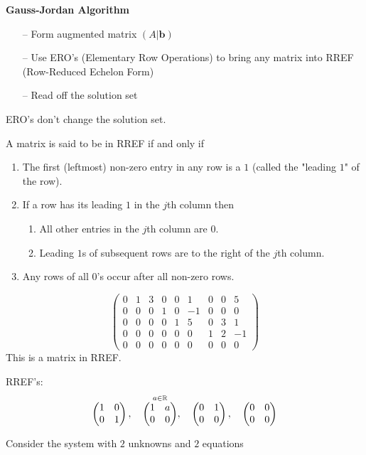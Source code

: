 \documentclass[10pt, a4paper]{article}
\newcommand{\mbf}[1]{\mathbf{#1}}
\begin{document}
\textbf{Gauss-Jordan Algorithm}
\begin{itemize}
    \item[--] Form augmented matrix $(A|\mbf{b})$
    \item[--] Use ERO's (Elementary Row Operations) to bring any matrix into RREF (Row-Reduced Echelon Form)
    \item[--] Read off the solution set
\end{itemize}

ERO's don't change the solution set.

\begin{definition}
    A matrix is said to be in RREF if and only if
    \begin{enumerate}[label = (\roman*)]
        \item The first (leftmost) non-zero entry in any row is a $1$ (called the "leading $1$" of the row).
        \item If a row has its leading $1$ in the $j$th column then
        \begin{enumerate}[label = (\alph*)]
            \item All other entries in the $j$th column are $0$.
            \item Leading $1$s of subsequent rows are to the right of the $j$th column.
        \end{enumerate}
        \item Any rows of all $0$'s occur after all non-zero rows.
    \end{enumerate}
\end{definition}

\begin{example}
    \[
    \begin{pmatrix}
        0 & 1 & 3 & 0 & 0 & 1 & 0 & 0 & 5 \\
        0 & 0 & 0 & 1 & 0 & -1 & 0 & 0 & 0 \\
        0 & 0 & 0 & 0 & 1 & 5 & 0 & 3 & 1 \\
        0 & 0 & 0 & 0 & 0 & 0 & 1 & 2 & -1 \\
        0 & 0 & 0 & 0 & 0 & 0 & 0 & 0 & 0
    \end{pmatrix}
    \]
    This is a matrix in RREF.
\end{example}

\begin{example}
    RREF's:
    \[
    \begin{pmatrix}
        1 & 0 \\ 0 & 1
    \end{pmatrix},
    \quad
    \overset{a \in \mathbb{R}}{
    \begin{pmatrix}
        1 & a \\ 0 & 0
    \end{pmatrix}},
    \quad
    \begin{pmatrix}
        0 & 1 \\ 0 & 0
    \end{pmatrix},
    \quad
    \begin{pmatrix}
        0 & 0 \\ 0 & 0
    \end{pmatrix}
    \]
\end{example}
Consider the system with $2$ unknowns and $2$ equations
\end{document}
